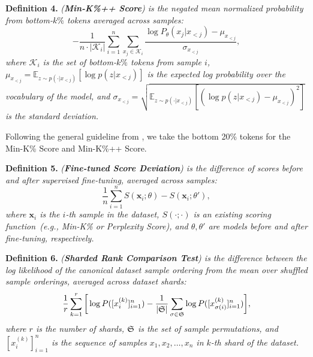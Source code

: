 \noindent\textbf{Definition 4.} \textit{(\textbf{Min-K\%++ Score}) is the negated mean normalized probability from bottom-$k\%$ tokens averaged across samples:}
\begin{equation}
    -\frac{1}{n \cdot |\mathcal{K}_i|}\sum_{i=1}^n \sum_{x_j \in \mathcal{K}_i} \frac{\log P_\theta(x_j | x_{<j}) - \mu_{x_{<j}}}{\sigma_{x_{<j}}},
\end{equation}
\textit{where $\mathcal{K}_i$ is the set of bottom-$k\%$ tokens from sample $i$, $\mu_{x_{<j}} = \mathbb{E}_{z\sim p(\cdot | x_{<j})} [\log p(z | x_{<j})]$ is the expected log probability over the vocabulary of the model, and $\sigma_{x_{<j}} = \sqrt{\mathbb{E}_{z\sim p(\cdot | x_{<j})} [(\log p(z | x_{<j}) - \mu_{x_{<j}})^2]}$ is the standard deviation.}~\cite{zhang2024min}

Following the general guideline from \citet{shidetecting}, we take the bottom 20\% tokens for the Min-K\% Score and Min-K\%++ Score.

\noindent\textbf{Definition 5.} \textit{(\textbf{Fine-tuned Score Deviation}) is the difference of scores before and after supervised fine-tuning, averaged across samples:}
\begin{equation}
    \frac{1}{n}\sum_{i=1}^n S(\mathbf{x}_i; \theta) - S(\mathbf{x}_i; \theta'),
\end{equation}
\textit{where $\mathbf{x}_i$ is the $i$-th sample in the dataset, $S(\cdot;\cdot)$ is an existing scoring function~(e.g., Min-K\% or Perplexity Score), and $\theta, \theta'$ are models before and after fine-tuning, respectively.}~\cite{zhang2024fine}


\noindent\textbf{Definition 6.} \textit{(\textbf{Sharded Rank Comparison Test}) is the difference between the log likelihood of the canonical dataset sample ordering from the mean over shuffled sample orderings, averaged across dataset shards:}
\begin{equation}
    \frac{1}{r} \sum_{k=1}^r \bigg[ \log P([x_i^{(k)}]_{i=1}^n) - \frac{1}{|\frak{S}|} \sum_{\sigma \in \frak{S}} \log P([x_{\sigma(i)}^{(k)}]_{i=1}^n) \bigg],
\end{equation}
\textit{where $r$ is the number of shards, $\frak{S}$ is the set of sample permutations, and $[x_i^{(k)}]_{i=1}^n$ is the sequence of samples $x_1, x_2, \ldots, x_n$ in $k$-th shard of the dataset.}~\cite{orenproving}